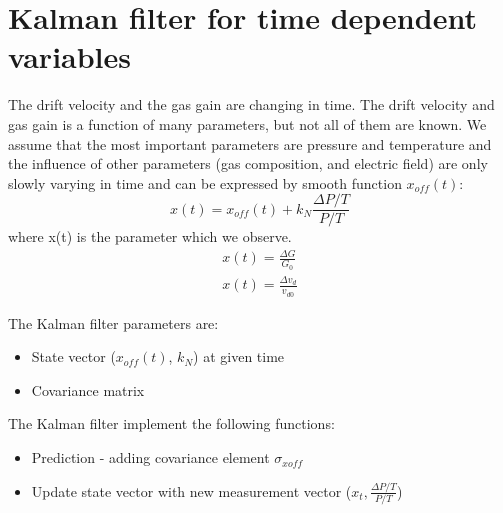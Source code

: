 \documentclass{elsart}
\begin{document}
\section{Kalman filter for time dependent variables}
\label{sec:kalman}
The drift velocity and the gas gain are changing in time.
The drift velocity and gas gain is a function of many parameters, but not all of 
them are known. We assume that the most important parameters are pressure and temperature
and the influence of other parameters (gas composition, and electric field) are only 
slowly varying in time and can be expressed by smooth function $x_{off}(t)$:
\begin{equation}
x(t) = x_{off}(t)+k_N\frac{\Delta{P/T}}{P/T}
\label{eq:KalmanTime}	
\end{equation}
where x(t) is the parameter which we observe.
\begin{equation}
\begin{split}
x(t)=\frac{\Delta{G}}{G_0}	\\
x(t)=\frac{\Delta{v_d}}{v_{d0}}	
\end{split}
\end{equation}

The Kalman filter parameters are:
\begin{itemize}
\item State vector  ($x_{off}(t)$, $k_N$) at given time
\item Covariance matrix
\end{itemize}

The Kalman filter implement the following functions:
\begin{itemize}
\item Prediction - adding covariance element $\sigma_{xoff}$
\item Update state vector with new measurement vector ($x_t,\frac{\Delta{P/T}}{P/T}$)
\end{itemize}
\end{document}
